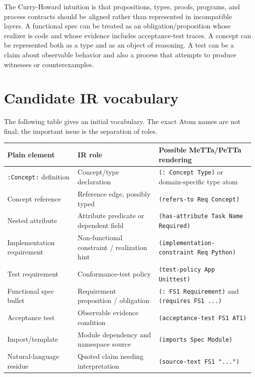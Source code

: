 \documentclass[11pt]{article}
\begin{document}
The Curry-Howard intuition is that propositions, types, proofs, programs, and
process contracts should be aligned rather than represented in incompatible
layers.  A functional spec can be treated as an obligation/proposition whose
realizer is code and whose evidence includes acceptance-test traces.  A concept
can be represented both as a type and as an object of reasoning.  A test can be a
claim about observable behavior and also a process that attempts to produce
witnesses or counterexamples.

\section{Candidate IR vocabulary}

The following table gives an initial vocabulary.  The exact Atom names are not
final; the important issue is the separation of roles.

\begin{longtable}{|p{1.5in}|p{2.1in}|p{2.5in}|}
\hline
Plain element & IR role & Possible MeTTa/PeTTa rendering \\
\hline
\texttt{:Concept:} definition & Concept/type declaration & \texttt{(: Concept Type)} or domain-specific type atom \\
\hline
Concept reference & Reference edge, possibly typed & \texttt{(refers-to Req Concept)} \\
\hline
Nested attribute & Attribute predicate or dependent field & \texttt{(has-attribute Task Name Required)} \\
\hline
Implementation requirement & Non-functional constraint / realization hint & \texttt{(implementation-constraint Req Python)} \\
\hline
Test requirement & Conformance-test policy & \texttt{(test-policy App Unittest)} \\
\hline
Functional spec bullet & Requirement proposition / obligation & \texttt{(: FS1 Requirement)} and \texttt{(requires FS1 ...)} \\
\hline
Acceptance test & Observable evidence condition & \texttt{(acceptance-test FS1 AT1)} \\
\hline
Import/template & Module dependency and namespace source & \texttt{(imports Spec Module)} \\
\hline
Natural-language residue & Quoted claim needing interpretation & \texttt{(source-text FS1 "...")} \\
\hline
\end{longtable}
\end{document}
